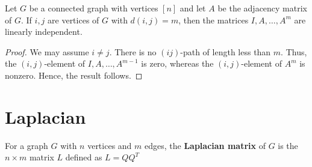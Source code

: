 \documentclass[../basic_graph_theory.tex]{subfiles}
\begin{document}
\begin{Thm}{}{}
  Let \(G\) be a connected graph with vertices \([n]\) and let \(A\) be the adjacency matrix of \(G\). If \(i, j\) are vertices of \(G\) with \(d(i, j) = m\), then the matrices \(I, A, \dots, A^m\) are linearly independent.
\end{Thm}
\begin{proof}
  We may assume \(i \not= j\). There is no \((ij)\)-path of length less than \(m\). Thus, the \((i, j)\)-element of \(I, A, \dots, A^{m-1}\) is zero, whereas the \((i, j)\)-element of \(A^m\) is nonzero. Hence, the result follows.
\end{proof}

\section{Laplacian}

For a graph $G$ with $n$ vertices and $m$ edges, the \textbf{Laplacian matrix} of $G$ is the $n \times m$ matrix $L$ defined as \(L = QQ^T\)
\end{document}
